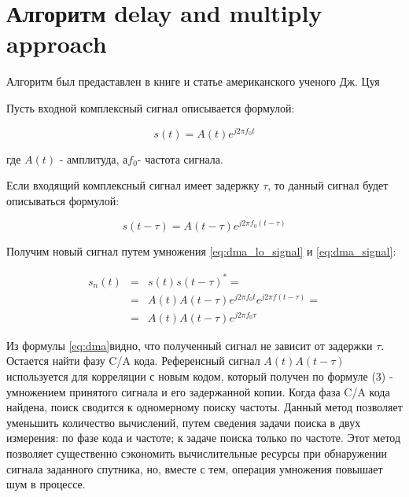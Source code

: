 \section{Алгоритм delay and multiply approach}

Алгоритм был предаставлен в книге и статье американского ученого Дж.
Цуя \cite{lin_dma, tsui}

Пусть входной комплексный сигнал описывается формулой:

\begin{center}
\begin{equation}
	s(t)=A(t)e^{j2{\pi}f_{0}t}\label{eq:dma_lo_signal}
\end{equation}
\end{center}

где $A(t)$ - амплитуда, а$f_{0}$- частота сигнала.

Если входящий комплексный сигнал имеет задержку $\tau$, то данный
сигнал будет описываться формулой: 

\begin{center}
\begin{equation}
	\label{eq:dma_signal}
	s(t-\tau)=A(t-\tau)e^{j2{\pi}f_{0}(t-\tau)}
\end{equation}
\end{center}

Получим новый сигнал путем умножения \ref{eq:dma_lo_signal} и \ref{eq:dma_signal}:

\begin{center}
\begin{eqnarray}
s_{n}(t) & = & s(t)s(t-\tau)^{*}=\nonumber \\
 & = & A(t)A(t-\tau)e^{j2\pi f_{0}t}e^{j2\pi f(t-\tau)}=\label{eq:dma}\\
 & = & A(t)A(t-\tau)e^{j2\pi f_{0}\tau}\nonumber 
\end{eqnarray}

\par\end{center}

Из формулы \ref{eq:dma}видно, что полученный сигнал не зависит от
задержки $\tau$. Остается найти фазу C/A кода. Референсный сигнал
$A(t)A(t-\tau)$ используется для корреляции с новым кодом, который
получен по формуле (3) - умножением принятого сигнала и его задержанной
копии. Когда фаза C/A кода найдена, поиск сводится к одномерному поиску
частоты. Данный метод позволяет уменьшить количество вычислений, путем
сведения задачи поиска в двух измерения: по фазе кода и частоте; к
задаче поиска только по частоте. Этот метод позволяет существенно
сэкономить вычислительные ресурсы при обнаружении сигнала заданного
спутника, но, вместе с тем, операция умножения повышает шум в процессе.

